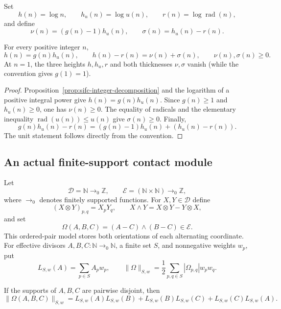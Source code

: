 Set
\[
 h(n)=\log n,\qquad h_u(n)=\log u(n),\qquad
 r(n)=\log\operatorname{rad}(n),
\]
and define
\begin{equation}
 \nu(n)=(g(n)-1)h_u(n),\qquad
 \sigma(n)=h_u(n)-r(n).
 \label{eq:sifc-thicknesses}
\end{equation}

\begin{proposition}
\label{prop:sifc-defect-split}
For every positive integer $n$,
\begin{equation}
 h(n)=g(n)h_u(n),\qquad
 h(n)-r(n)=\nu(n)+\sigma(n),\qquad
 \nu(n),\sigma(n)\geq0.
 \label{eq:sifc-defect-identity}
\end{equation}
At $n=1$, the three heights $h,h_u,r$ and both thicknesses
$\nu,\sigma$ vanish (while the convention gives $g(1)=1$).
\end{proposition}

\begin{proof}
Proposition~\ref{prop:sifc-integer-decomposition} and the logarithm of a
positive integral power give $h(n)=g(n)h_u(n)$.  Since $g(n)\geq1$ and
$h_u(n)\geq0$, one has $\nu(n)\geq0$.  The equality of radicals and the
elementary inequality $\operatorname{rad}(u(n))\leq u(n)$ give
$\sigma(n)\geq0$.  Finally,
\[
 g(n)h_u(n)-r(n)
 =(g(n)-1)h_u(n)+(h_u(n)-r(n)).
\]
The unit statement follows directly from the convention.
\end{proof}

\subsection{An actual finite-support contact module}

Let
\[
 \mathcal D=\mathbb N\to_0\mathbb Z,
 \qquad
 \mathcal E=(\mathbb N\times\mathbb N)\to_0\mathbb Z,
\]
where $\to_0$ denotes finitely supported functions.  For $X,Y\in\mathcal D$
define
\[
 (X\otimes Y)_{p,q}=X_pY_q,\qquad
 X\wedge Y=X\otimes Y-Y\otimes X,
\]
and set
\[
 \Omega(A,B,C)=(A-C)\wedge(B-C)\in\mathcal E.
\]
This ordered-pair model stores both orientations of each alternating
coordinate.  For effective divisors $A,B,C:\mathbb N\to_0\mathbb N$, a
finite set $S$, and nonnegative weights $w_p$, put
\[
 L_{S,w}(A)=\sum_{p\in S}A_pw_p,
 \qquad
 \|\Omega\|_{S,w}
 =\frac12\sum_{p,q\in S}|\Omega_{p,q}|w_pw_q.
\]

\begin{proposition}
\label{prop:sifc-finite-mixed-area}
If the supports of $A,B,C$ are pairwise disjoint, then
\begin{equation}
 \|\Omega(A,B,C)\|_{S,w}
 =L_{S,w}(A)L_{S,w}(B)
  +L_{S,w}(B)L_{S,w}(C)
  +L_{S,w}(C)L_{S,w}(A).
 \label{eq:sifc-finite-mixed-area}
\end{equation}
\end{proposition}

